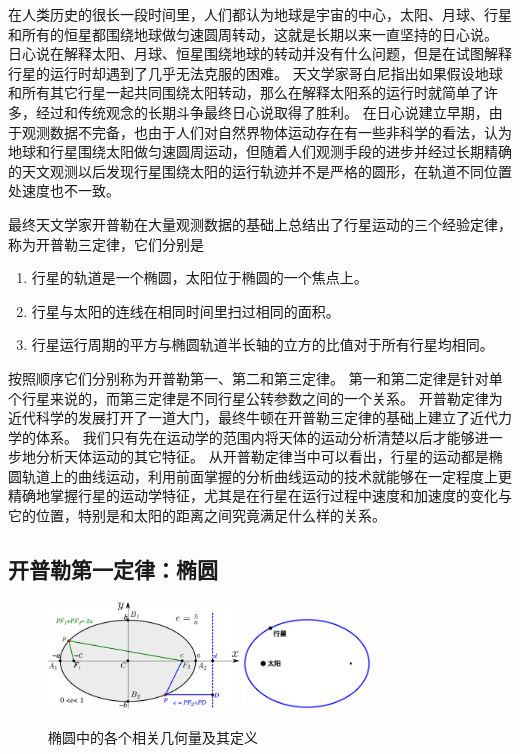 在人类历史的很长一段时间里，人们都认为地球是宇宙的中心，太阳、月球、行星和所有的恒星都围绕地球做匀速圆周转动，这就是长期以来一直坚持的{\heiti 日心说}。
日心说在解释太阳、月球、恒星围绕地球的转动并没有什么问题，但是在试图解释行星的运行时却遇到了几乎无法克服的困难。
天文学家哥白尼指出如果假设地球和所有其它行星一起共同围绕太阳转动，那么在解释太阳系的运行时就简单了许多，经过和传统观念的长期斗争最终{\heiti 日心说}取得了胜利。
在日心说建立早期，由于观测数据不完备，也由于人们对自然界物体运动存在有一些非科学的看法，认为地球和行星围绕太阳做匀速圆周运动，但随着人们观测手段的进步并经过长期精确的天文观测以后发现行星围绕太阳的运行轨迹并不是严格的圆形，在轨道不同位置处速度也不一致。

最终天文学家开普勒在大量观测数据的基础上总结出了行星运动的三个经验定律，称为{\heiti 开普勒三定律}，它们分别是
\begin{enumerate}
\item 行星的轨道是一个椭圆，太阳位于椭圆的一个焦点上。
\item 行星与太阳的连线在相同时间里扫过相同的面积。
\item 行星运行周期的平方与椭圆轨道半长轴的立方的比值对于所有行星均相同。
\end{enumerate}
按照顺序它们分别称为开普勒第一、第二和第三定律。
第一和第二定律是针对单个行星来说的，而第三定律是不同行星公转参数之间的一个关系。
开普勒定律为近代科学的发展打开了一道大门，最终牛顿在开普勒三定律的基础上建立了近代力学的体系。
我们只有先在运动学的范围内将天体的运动分析清楚以后才能够进一步地分析天体运动的其它特征。
从开普勒定律当中可以看出，行星的运动都是椭圆轨道上的曲线运动，利用前面掌握的分析曲线运动的技术就能够在一定程度上更精确地掌握行星的运动学特征，尤其是在行星在运行过程中速度和加速度的变化与它的位置，特别是和太阳的距离之间究竟满足什么样的关系。


\subsection{开普勒第一定律：椭圆}
\begin{figure}[hbtp]
\centering
\includegraphics[width=0.45\textwidth]{images/motion-ellipse-detail.pdf}  
\includegraphics[width=0.3\textwidth]{images/motion-21.pdf} 

\caption{椭圆中的各个相关几何量及其定义}\label{fig: motion-椭圆的定义}
\end{figure}


